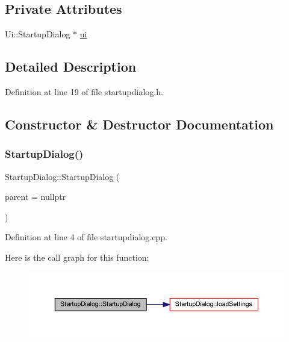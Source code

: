 \subsection*{Private Attributes}
\begin{DoxyCompactItemize}
\item 
Ui\+::\+Startup\+Dialog $\ast$ \mbox{\hyperlink{class_startup_dialog_abd18126b373fe2249cfd15cd9cadce5b}{ui}}
\end{DoxyCompactItemize}


\subsection{Detailed Description}


Definition at line 19 of file startupdialog.\+h.



\subsection{Constructor \& Destructor Documentation}
\mbox{\label{class_startup_dialog_a720174c5233d6b33f5d65b9c404b4445}} 
\subsubsection{\texorpdfstring{StartupDialog()}{StartupDialog()}}
{\footnotesize\ttfamily Startup\+Dialog\+::\+Startup\+Dialog (\begin{DoxyParamCaption}\item[{Q\+Widget $\ast$}]{parent = {\ttfamily nullptr} }\end{DoxyParamCaption})\hspace{0.3cm}{\ttfamily [explicit]}}



Definition at line 4 of file startupdialog.\+cpp.

Here is the call graph for this function\+:
\nopagebreak
\begin{figure}[H]
\begin{center}
\leavevmode
\includegraphics[width=350pt]{class_startup_dialog_a720174c5233d6b33f5d65b9c404b4445_cgraph}
\end{center}
\end{figure}
\mbox{\label{class_startup_dialog_a21e41329a66a0ceb4aae21baba78bd0d}} 
